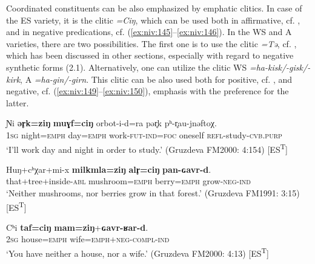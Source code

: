 \documentclass[output=paper,colorlinks,citecolor=brown]{langscibook}
\begin{document}
Coordinated constituents can be also emphasized by emphatic clitics. In case of the ES variety, it is the clitic \textit{=Ciŋ}, which can be used both in affirmative, cf. , and in negative predications, cf. (\ref{ex:niv:145}--\ref{ex:niv:146}). In the WS and A varieties, there are two possibilities. The first one is to use the clitic \textit{=Tə}, cf. , which has been discussed in other sections, especially with regard to negative synthetic forms (2.1). Alternatively, one can utilize the clitic WS \textit{=ha-kisk/-gisk/-kirk}, A \textit{=ha-gin/-girn}. This clitic can be also used both for positive, cf. , and negative, cf. (\ref{ex:niv:149}--\ref{ex:niv:150}), emphasis with the preference for the latter.


\ea\label{ex:niv:144}
    \gll Ɲi \textbf{ər̥k=ziŋ} \textbf{muɣf=ciŋ} orbot-i-d=ra pər̥k pʰ-r̥au-jnəftoχ. \\ 
         \textsc{1sg} night=\textsc{emph} day=\textsc{emph} work-\textsc{fut-ind=foc} oneself \textsc{refl-}study-\textsc{cvb.purp} \\
    \glt ‘I’ll work day and night in order to study.’ (Gruzdeva FM2000: 4:154) [ES\textsuperscript{T}]
\z 

\ea\label{ex:niv:145}
    \gll Huŋ+cʰχar+mi-x \textbf{milkmla=ziŋ} \textbf{alr̥=ciŋ} \textbf{pan-ɢavr-d}. \\ 
         that+tree+inside-\textsc{abl} mushroom=\textsc{emph} berry=\textsc{emph} grow-\textsc{neg-ind} \\
    \glt ‘Neither mushrooms, nor berries grow in that forest.’ (Gruzdeva FM1991: 3:15) [ES\textsuperscript{T}]
\z 

\ea\label{ex:niv:146}
    \gll Cʰi \textbf{taf=ciŋ} \textbf{mam=ziŋ}+\textbf{ɢavr-ʁar-d}. \\ 
         \textsc{2sg} house=\textsc{emph} wife=\textsc{emph}+\textsc{neg-compl-ind} \\
    \glt ‘You have neither a house, nor a wife.’ (Gruzdeva FM2000: 4:13) [ES\textsuperscript{T}]
\z 

\end{document}
